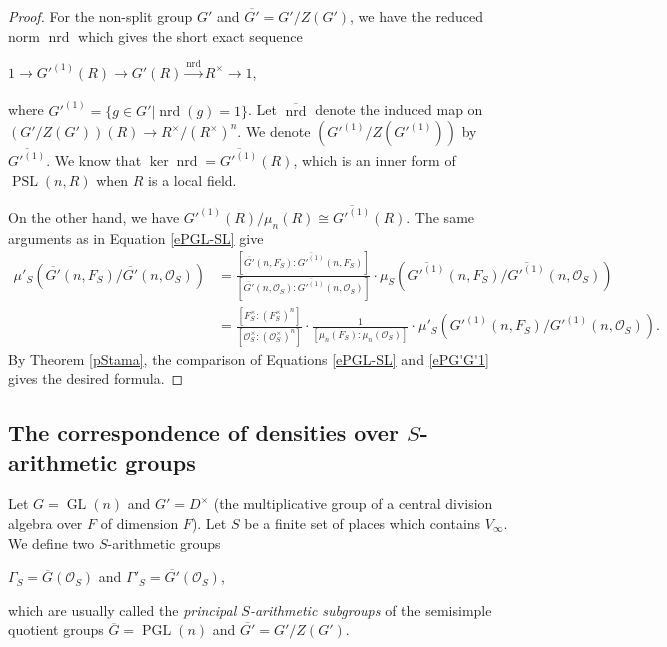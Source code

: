 \documentclass[11pt]{article}
\theoremstyle{plain}
\theoremstyle{remark}
\theoremstyle{definition}
\DeclareMathOperator{\GL}{GL}
\DeclareMathOperator{\PGL}{PGL}
\DeclareMathOperator{\PSL}{PSL}
\DeclareMathOperator{\nrd}{nrd}
\begin{document}
\begin{proof}
For the non-split group $G'$ and $\overline{G'}=G'/Z(G')$, we have the reduced norm $\nrd$ which gives the short exact sequence
\begin{center}
    $1\xrightarrow[]{} G'^{(1)}(R)\xrightarrow[]{}G'(R)\xrightarrow[]{\nrd}  R^{\times}\to 1$,
\end{center}
where $G'^{(1)}=\{g\in G'|\nrd(g)=1\}$. 
Let $\overline{\nrd}$ denote the induced map on $(G'/Z(G'))(R)\to R^{\times}/(R^{\times})^{n}$.
We denote $(G'^{(1)}/Z(G'^{(1)}))$ by $\overline{G'^{(1)}}$. 
We know that $\ker\nrd=\overline{G'^{(1)}}(R)$, which is an inner form of $\PSL(n,R)$ when $R$ is a local field. 


On the other hand, we have $G'^{(1)}(R)/\mu_{n}(R)\cong \overline{G'^{(1)}}(R)$. 
The same arguments as in Equation \eqref{ePGL-SL} give
\begin{equation}\label{ePG'G'1}
\begin{aligned}
    \mu'_{S}(\overline{G'}(n,F_S)/\overline{G'}(n,\mathcal{O}_S))&=\frac{[\overline{G'}(n,F_S):\overline{G'^{(1)}}(n,F_S)]}{[\overline{G'}(n,\mathcal{O}_S):\overline{G'^{(1)}}(n,\mathcal{O}_S)]}\cdot \mu_{S}(\overline{G'^{(1)}}(n,F_S)/\overline{G'^{(1)}}(n,\mathcal{O}_S))\\&=\frac{[F_S^{\times}:(F_S^{\times})^n]}{[\mathcal{O}_S^{\times}:(\mathcal{O}_S^{\times})^n]}\cdot \frac{1}{[\mu_n(F_S):\mu_n(\mathcal{O}_S)]}\cdot \mu'_{S}(G'^{(1)}(n,F_S)/G'^{(1)}(n,\mathcal{O}_S)). 
\end{aligned}
\end{equation}
By Theorem \ref{pStama}, the comparison of Equations \eqref{ePGL-SL} and \eqref{ePG'G'1} gives the desired formula. 
\end{proof}






\subsection{The correspondence of densities over $S$-arithmetic groups}

Let $G=\GL(n)$ and $G'=D^{\times}$ (the multiplicative group of a central division algebra over $F$ of dimension $F$). 
Let $S$ be a finite set of places which contains $V_{\infty}$. 
We define two $S$-arithmetic groups
\begin{center}
    $\Gamma_{S}=\overline{G}(\mathcal{O}_S)$ and $\Gamma'_{S}=\overline{G'}(\mathcal{O}_S)$,
\end{center}
which are usually called the {\it principal $S$-arithmetic subgroups} of the semisimple quotient groups $\overline{G}=\PGL(n)$ and $\overline{G'}=G'/Z(G')$. 
\end{document}
